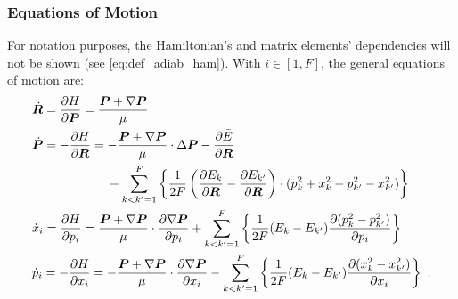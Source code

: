 \subsubsection{Equations of Motion}
%
For notation purposes, the Hamiltonian's and matrix elements' dependencies will 
not be shown (see \cref{eq:def_adiab_ham}). With $ i \in [1, F] $, the general equations of motion are:
\begin{subequations}\label{eq:adiab_motion}
\begin{align}
&\dot{\bm{R}} = \frac{\partial H}{\partial \bm{P}} = \frac{\bm{P}+\nabla\bm{P}}{\mu}\\
&\dot{\bm{P}} = -\frac{\partial H}{\partial \bm{R}} = 
-\frac{\bm{P}+\nabla\bm{P}}{\mu}\cdot\Delta\bm{P}-\frac{\partial \bar{E}}{\partial \bm{R}}\\
&\qquad\qquad\qquad-\sum\limits_{k<k'=1}^{F}\left\{ \frac{1}{2F}\left(\frac{\partial E_{k}}{\partial \bm{R}}-\frac{\partial E_{k'}}{\partial \bm{R}}\right)\cdot(p_{k}^{2}+x_{k}^{2}-p_{k'}^{2}-x_{k'}^{2})\right\}
\nonumber\\
&\dot{x}_{i} = \frac{\partial H}{\partial p_{i}} = 
\frac{\bm{P}+\nabla\bm{P}}{\mu}\cdot\frac{\partial \nabla\bm{P}}{\partial p_{i}}
+\sum\limits_{k<k'=1}^{F}\left\{
\frac{1}{2F}(E_{k}-E_{k'})\frac{\partial (p_{k}^{2}-p_{k'}^{2})}{\partial p_{i}}\right\}\\
&\dot{p}_{i} = -\frac{\partial H}{\partial x_{i}} = 
-\frac{\bm{P}+\nabla\bm{P}}{\mu}\cdot\frac{\partial \nabla\bm{P}}{\partial x_{i}}
-\sum\limits_{k<k'=1}^{F}\left\{
\frac{1}{2F}(E_{k}-E_{k'})\frac{\partial (x_{k}^{2}-x_{k'}^{2})}{\partial x_{i}}\right\}~.
\end{align}
\end{subequations}

